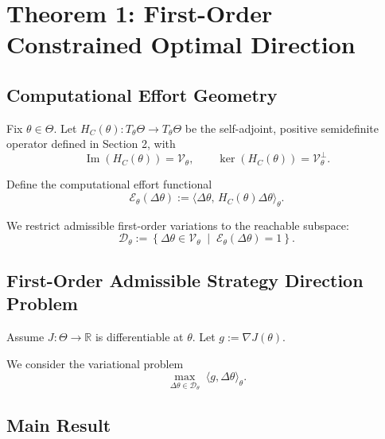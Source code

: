 \documentclass[11pt,a4paper,twocolumn]{article}
\begin{document}
 \section{Theorem 1: First-Order Constrained Optimal Direction}
 
 \subsection{Computational Effort Geometry}
 
 Fix $\theta \in \Theta$.  
 Let $H_C(\theta): T_\theta\Theta \to T_\theta\Theta$ be the self-adjoint, positive semidefinite operator defined in Section 2,
 with
 \[
 \operatorname{Im}(H_C(\theta))=\mathcal{V}_\theta,
 \qquad
 \ker(H_C(\theta))=\mathcal{V}_\theta^\perp.
 \]
 
 Define the computational effort functional
 \begin{equation}
  \mathcal{E}_\theta(\Delta\theta)
  :=
  \langle \Delta\theta,\, H_C(\theta)\Delta\theta\rangle_\theta .
 \end{equation}
 
 We restrict admissible first-order variations to the reachable subspace:
 \begin{equation}
  \mathcal{D}_\theta
  :=
  \left\{
  \Delta\theta \in \mathcal{V}_\theta
  \;\middle|\;
  \mathcal{E}_\theta(\Delta\theta)=1
  \right\}.
 \end{equation}
 
 \subsection{First-Order Admissible Strategy Direction Problem}
 
 Assume $J:\Theta\to\mathbb{R}$ is differentiable at $\theta$.
 Let $g := \nabla J(\theta)$.
 
 We consider the variational problem
 \begin{equation}
  \label{eq:varproblem}
  \max_{\Delta\theta\in\mathcal{D}_\theta}
  \;
  \langle g,\Delta\theta\rangle_\theta .
 \end{equation}
 
 \subsection{Main Result}
 
\end{document}
